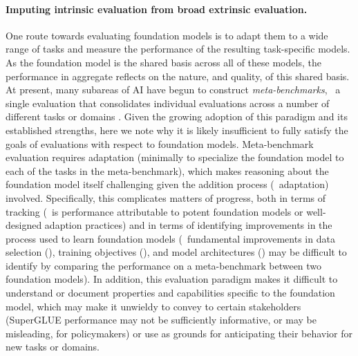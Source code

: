 \paragraph{Imputing intrinsic evaluation from broad extrinsic evaluation.}
One route towards evaluating foundation models is to adapt them to a wide range of tasks and measure the performance of the resulting task-specific models.
As the foundation model is the shared basis across all of these models, the performance in aggregate reflects on the nature, and quality, of this shared basis.
At present, many subareas of AI have begun to construct \textit{meta-benchmarks}, \ie~a single evaluation that consolidates individual evaluations across a number of different tasks or domains \citep{wang2019glue, wang2019superglue, hu2020xtreme, santurkar2020breeds, gehrmann-etal-2021-gem, hendrycks2021measuring, koh2021wilds, Tamkin2021DABS}.
Given the growing adoption of this paradigm and its established strengths, here we note why it is likely insufficient to fully satisfy the goals of evaluations with respect to foundation models.
Meta-benchmark evaluation requires adaptation (minimally to specialize the foundation model to each of the tasks in the meta-benchmark), which makes reasoning about the foundation model itself challenging given the addition process (\ie~adaptation) involved. 
Specifically, this complicates matters of progress, both in terms of tracking (\eg~is performance attributable to potent foundation models or well-designed adaption practices) and in terms of identifying improvements in the process used to learn foundation models (\eg~fundamental improvements in data selection (), training objectives (), and model architectures () may be difficult to identify by comparing the performance on a meta-benchmark between two foundation models).
In addition, this evaluation paradigm makes it difficult to understand or document properties and capabilities specific to the foundation model, which may make it unwieldy to convey to certain stakeholders (\eg SuperGLUE performance may not be sufficiently informative, or may be misleading, for policymakers) or use as grounds for anticipating their behavior for new tasks or domains.  

